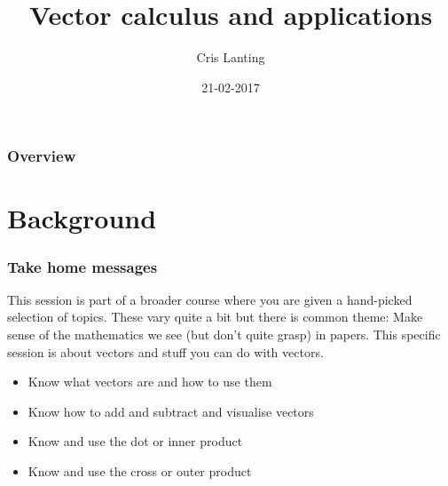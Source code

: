 \documentclass{beamer}
\title[Vectors and other useful stuf]{Vector calculus and applications} %
\author{Cris Lanting} %
\institute[UMCG] %
{
Clinical Physicist, Audiologist
University Medical Center Groningen \\ %
Dept. of Otorhinolaryngology\\
\medskip
\textit{c.p.lanting@umcg.nl\\
https://github.com/Crisly/Lectures}
} %
\date{21-02-2017} %
\begin{document}
\begin{frame}
\titlepage %
\end{frame}

\begin{frame}
\frametitle{Overview} %
\tableofcontents %
\end{frame}


\section{Background} %

\begin{frame}
\frametitle{Take home messages}
This session is part of a broader course where you are given a hand-picked selection of topics. These vary quite a bit but there is common theme:
Make sense of the mathematics we see (but don't quite grasp) in papers. This specific session is about vectors and stuff you can do with vectors.\\
\begin{itemize}
\item Know what vectors are and how to use them
\item Know how to add and subtract and visualise vectors 
\item Know and use the dot or inner product
\item Know and use the cross or outer product
\end{itemize}
\end{frame}
\end{document}
